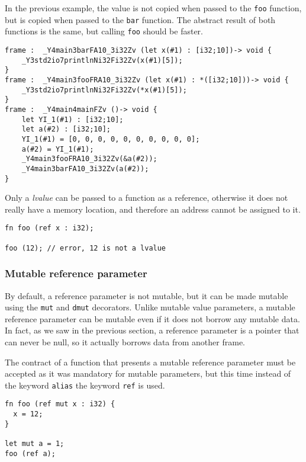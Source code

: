In the previous example, the value is not copied when passed to the \texttt{foo}
function, but is copied when passed to the \texttt{bar} function. The abstract
result of both functions is the same, but calling \texttt{foo} should be faster.

\begin{lstlisting}[style=intermediateVerb]
frame :  _Y4main3barFA10_3i32Zv (let x(#1) : [i32;10])-> void {
    _Y3std2io7printlnNi32Fi32Zv(x(#1)[5]);
}
frame :  _Y4main3fooFRA10_3i32Zv (let x(#1) : *([i32;10]))-> void {
    _Y3std2io7printlnNi32Fi32Zv(*x(#1)[5]);
}
frame :  _Y4main4mainFZv ()-> void {
    let YI_1(#1) : [i32;10];
    let a(#2) : [i32;10];
    YI_1(#1) = [0, 0, 0, 0, 0, 0, 0, 0, 0, 0];
    a(#2) = YI_1(#1);
    _Y4main3fooFRA10_3i32Zv(&a(#2));
    _Y4main3barFA10_3i32Zv(a(#2));
}
\end{lstlisting}

Only a \textit{lvalue} can be passed to a function as a reference, otherwise it
does not really have a memory location, and therefore an address cannot be
assigned to it.

\begin{lstlisting}[style=coloredverbatim]
fn foo (ref x : i32);

foo (12); // error, 12 is not a lvalue
\end{lstlisting}

\subsubsection{Mutable reference parameter}

By default, a reference parameter is not mutable, but it can be made mutable
using the \texttt{mut} and \texttt{dmut} decorators. Unlike mutable value
parameters, a mutable reference parameter can be mutable even if it does not
borrow any mutable data. In fact, as we saw in the previous section, a reference
parameter is a pointer that can never be null, so it actually borrows data from
another frame.

The contract of a function that presents a mutable reference parameter must be
accepted as it was mandatory for mutable parameters, but this time instead of
the keyword \texttt{alias} the keyword \texttt{ref} is used.

\begin{lstlisting}[style=coloredverbatim]
fn foo (ref mut x : i32) {
  x = 12;
}

let mut a = 1;
foo (ref a);
\end{lstlisting}

